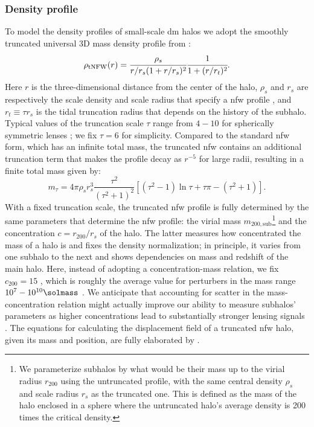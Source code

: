 \subsubsection{Density profile}
To model the density profiles of small-scale \gls*{dm} halos we adopt the smoothly truncated universal 3D mass density profile from \cite{Baltz:2007vq}:
\begin{equation}
    \rho_{\mathrm{tNFW}}(r)= \cfrac{\rho_s}{r/r_s (1+r/r_s)^2}  \cfrac{1}{1+(r/r_t)^2}.
\end{equation}
Here $r$ is the three-dimensional distance from the center of the halo, $\rho_s$ and $r_s$ are respectively the scale density and scale radius that specify a \gls*{nfw} profile \citep{Navarro:1996gj}, and $r_t\equiv\tau r_s$ is the tidal truncation radius that depends on the history of the subhalo. Typical values of the truncation scale $\tau$ range from $4-10$ for spherically symmetric lenses \citep{Gilman:2019nap, Cyr-Racine:2019aa}; we fix $\tau=6$ for simplicity. 
Compared to the standard \gls*{nfw} form, which has an infinite total mass, the truncated \gls*{nfw} contains an additional truncation term that makes the profile decay as $r^{-5}$ for large radii, resulting in a finite total mass given by:
\begin{equation}
    m_\tau=4\pi \rho_s r_s^3 \frac{\tau^2}{(\tau^2+1)^2}[(\tau^2-1)\ln\tau+\tau\pi-(\tau^2 +1)].
\end{equation}
With a fixed truncation scale, the truncated \gls*{nfw} profile is fully determined by the same parameters that determine the \gls*{nfw} profile: the virial mass $m_\mathrm{200, sub}$\footnote{We parameterize subhalos by what would be their mass up to the virial radius $r_{200}$ using the untruncated profile, with the same central density $\rho_s$ and scale radius $r_s$ as the truncated one. This is defined as the mass of the halo enclosed in a sphere where the untruncated halo's average density is 200 times the critical density.} and the concentration $c=r_{200}/r_s$ of the halo. The latter measures how concentrated the mass of a halo is and fixes the density normalization; in principle, it varies from one subhalo to the next and shows dependencies on mass and redshift of the main halo. Here, instead of adopting a concentration-mass relation, we fix $c_{200}=15$ , which is roughly the average value for perturbers in the mass range $10^7-10^{10}\si{\solmass}$ \citep[Fig. 7]{Richings:2020auv}. We anticipate that accounting for scatter in the mass-concentration relation might actually improve our ability to measure subhalos’ parameters as higher concentrations lead to substantially stronger lensing signals \citep{Amorisco:2021iim}.
The equations for calculating the displacement field of a truncated \gls*{nfw} halo, given its mass and position, are fully elaborated by \cite[Appendix A]{Baltz:2007vq}.

